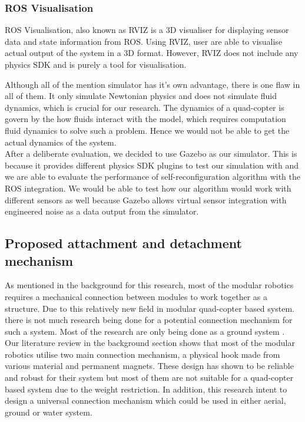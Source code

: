 \documentclass[12pt,A4]{article}
\begin{document}
	\subsubsection{ROS Visualisation}
	\hfill\begin{minipage}{\dimexpr\textwidth-1cm}
	ROS Visualisation, also known as RVIZ is a 3D visualiser for displaying sensor data and state information from ROS. Using RVIZ, user are able to visualise actual output of the system in a 3D format. However, RVIZ does not include any physics SDK and is purely a tool for visualisation.\\
	\end{minipage}
	
	Although all of the mention simulator has it's own advantage, there is one flaw in all of them. It only simulate Newtonian physics and does not simulate fluid dynamics, which is crucial for our research. The dynamics of a quad-copter is govern by the how fluids interact with the model, which requires computation fluid dynamics to solve such a problem. Hence we would not be able to get the actual dynamics of the system.\\
	
	After a deliberate evaluation, we decided to use Gazebo as our simulator. This is because it provides different physics SDK plugins to test our simulation with and we are able to evaluate the performance of self-reconfiguration algorithm with the ROS integration. We would be able to test how our algorithm would work with different sensors as well because Gazebo allows virtual sensor integration with engineered noise as a data output from the simulator.\\
	
	\subsection{Proposed attachment and detachment mechanism}
	
	As mentioned in the background for this research, most of the modular robotics requires a mechanical connection between modules to work together as a structure. Due to this relatively new field in modular quad-copter based system. there is not much research being done for a potential connection mechanism for such a system. Most of the research are only being done as a ground system \citep{yim2007modular}. \\
	
	Our literature review in the background section shows that most of the modular robotics utilise two main connection mechanism, a physical hook made from various material and permanent magnets. These design has shown to be reliable and robust for their system but most of them are not suitable for a quad-copter based system due to the weight restriction. In addition, this research intent to design a universal connection mechanism which could be used in either aerial, ground or water system.\\
	
\end{document}
